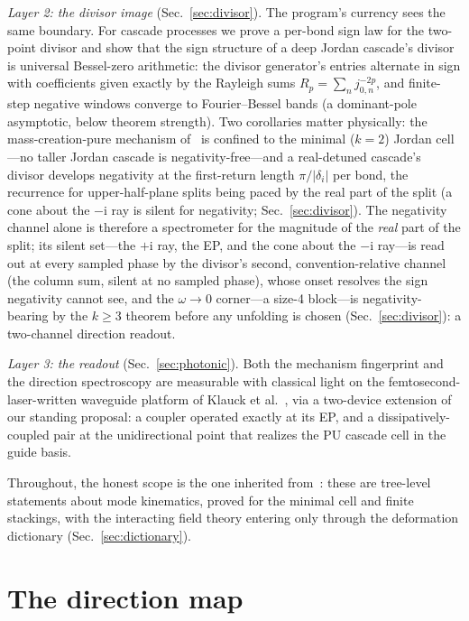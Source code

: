 ﻿\documentclass[11pt]{article}
\newcommand{\ii}{\mathrm{i}}
\theoremstyle{remark}
\begin{document}
\emph{Layer 2: the divisor image} (Sec.~\ref{sec:divisor}). The
program's currency sees the same boundary. For cascade processes we
prove a per-bond sign law for the two-point divisor and show that
the sign structure of a deep Jordan cascade's divisor is universal
Bessel-zero arithmetic: the divisor generator's entries alternate in
sign with coefficients given exactly by the Rayleigh sums
$R_p=\sum_n j_{0,n}^{-2p}$, and finite-step negative windows
converge to Fourier--Bessel bands (a dominant-pole asymptotic,
below theorem strength). Two corollaries matter
physically: the mass-creation-pure mechanism of~\cite{choosing}
is confined to the minimal ($k=2$) Jordan cell---no taller Jordan
cascade is negativity-free---and a real-detuned cascade's
divisor develops negativity at the first-return length
$\pi/|\delta_i|$ per bond, the recurrence for upper-half-plane
splits being paced by the real part of the split (a cone about
the $-\ii$ ray is silent for negativity; Sec.~\ref{sec:divisor}).
The negativity channel alone is therefore a spectrometer for the
magnitude of the \emph{real} part of the split; its silent set---the
$+\ii$ ray, the EP, and the cone about the $-\ii$ ray---is
read out at every sampled phase by the divisor's second, convention-relative
channel (the column sum, silent at no sampled phase), whose onset resolves the
sign negativity cannot see, and the
$\omega\to0$ corner---a size-4 block---is negativity-bearing by
the $k\ge3$ theorem before any unfolding is chosen
(Sec.~\ref{sec:divisor}): a two-channel direction readout.

\emph{Layer 3: the readout} (Sec.~\ref{sec:photonic}). Both the
mechanism fingerprint and the direction spectroscopy are measurable
with classical light on the femtosecond-laser-written waveguide
platform of Klauck et al.~\cite{Klauck2019}, via a two-device
extension of our standing proposal: a coupler operated exactly at
its EP, and a dissipatively-coupled pair at the unidirectional point
that realizes the PU cascade cell in the guide basis.

Throughout, the honest scope is the one inherited
from~\cite{choosing}: these are tree-level statements about mode
kinematics, proved for the minimal cell and finite stackings, with
the interacting field theory entering only through the
deformation dictionary (Sec.~\ref{sec:dictionary}).

\section{The direction map}
\label{sec:map}
\end{document}

